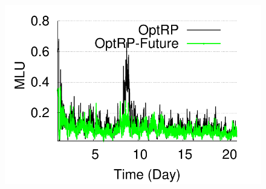 {\begin{figure}
\centering
\includegraphics[scale=0.5]{graphSet1/software/mlu_Xiaozheng.pdf}
\end{figure}

}









